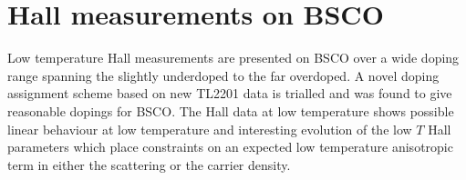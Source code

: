 \chapter{Hall measurements on \acs{BSCO}}
    \label{Sec:HallBSCO}

\begin{chapterabstract}
Low temperature Hall measurements are presented on \ac{BSCO} over a wide doping range spanning the slightly underdoped to the far overdoped. A novel doping assignment scheme based on new \ac{TL2201} data is trialled and was found to give reasonable dopings for \ac{BSCO}. The Hall data at low temperature shows possible linear behaviour at low temperature and interesting evolution of the low $T$ Hall parameters which place constraints on an expected low temperature anisotropic term in either the scattering or the carrier density.
\end{chapterabstract}










